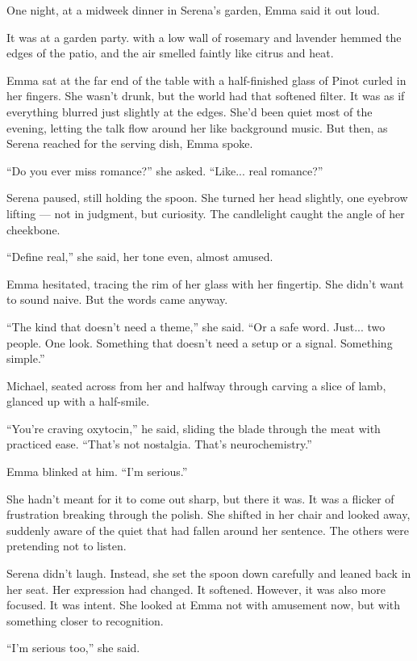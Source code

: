 One night, at a midweek dinner in Serena’s garden, Emma said it out loud.

It was at a garden party. 
with a low wall of rosemary and lavender hemmed the edges of the patio, and the air 
smelled faintly like citrus and heat.

Emma sat at the far end of the table with a half-finished glass of Pinot curled in her fingers. She 
wasn’t drunk, but the world had that softened filter. It was as if everything blurred just slightly 
at the edges. She’d been quiet most of the evening, letting the talk flow around her like background 
music. But then, as Serena reached for the serving dish, Emma spoke.

``Do you ever miss romance?'' she asked. ``Like... real romance?''

Serena paused, still holding the spoon. She turned her head slightly, one eyebrow lifting — not in 
judgment, but curiosity. The candlelight caught the angle of her cheekbone.

``Define real,'' she said, her tone even, almost amused.

Emma hesitated, tracing the rim of her glass with her fingertip. She didn’t want to sound naive. But 
the words came anyway.

``The kind that doesn’t need a theme,'' she said. ``Or a safe word. Just... two people. One look. 
Something that doesn't need a setup or a signal. Something simple.''

Michael, seated across from her and halfway through carving a slice of lamb, glanced up with a half-smile.

``You’re craving oxytocin,'' he said, sliding the blade through the meat with practiced ease. ``That’s not 
nostalgia. That’s neurochemistry.''

Emma blinked at him. ``I’m serious.''

She hadn’t meant for it to come out sharp, but there it was. It was a flicker of frustration breaking through 
the polish. She shifted in her chair and looked away, suddenly aware of the quiet that had fallen around her 
sentence. The others were pretending not to listen.

Serena didn’t laugh. Instead, she set the spoon down carefully and leaned back in her seat. Her expression had 
changed. It softened. However, it was also more focused. It was intent. She looked at Emma not with amusement now, 
but with something closer to recognition.

``I’m serious too,'' she said.

